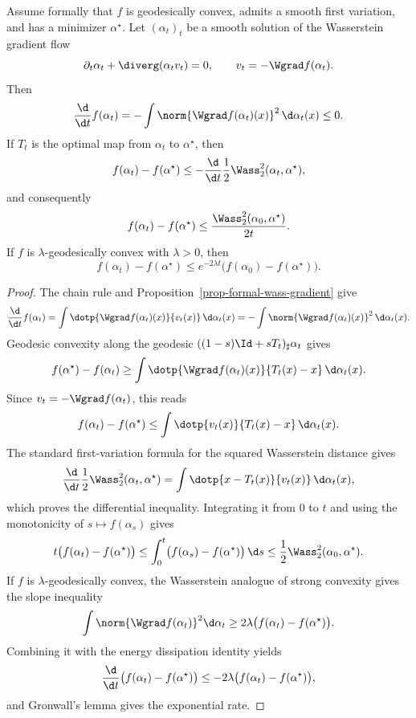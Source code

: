 \begin{prop}\label{prop-convex-wass-flow-rate}
	Assume formally that $f$ is geodesically convex, admits a smooth first variation, and has a minimizer $\alpha^\star$. Let $(\alpha_t)_t$ be a smooth solution of the Wasserstein gradient flow
	\[
		\partial_t\alpha_t+\diverg(\alpha_t v_t)=0,
		\qquad
		v_t=-\Wgrad f(\alpha_t).
	\]
	Then
	\[
		\frac{\d}{\d t} f(\alpha_t)
		=
		-\int \norm{\Wgrad f(\alpha_t)(x)}^2\,\d\alpha_t(x)
		\leq 0.
	\]
	If $T_t$ is the optimal map from $\alpha_t$ to $\alpha^\star$, then
	\[
		f(\alpha_t)-f(\alpha^\star)
		\leq
		-\frac{\d}{\d t}\frac12 \Wass_2^2(\alpha_t,\alpha^\star),
	\]
	and consequently
	\[
		f(\alpha_t)-f(\alpha^\star)
		\leq
		\frac{\Wass_2^2(\alpha_0,\alpha^\star)}{2t}.
	\]
	If $f$ is $\lambda$-geodesically convex with $\lambda>0$, then
	\[
		f(\alpha_t)-f(\alpha^\star)
		\leq
		e^{-2\lambda t}\bigl(f(\alpha_0)-f(\alpha^\star)\bigr).
	\]
\end{prop}

\begin{proof}
	The chain rule and Proposition~\ref{prop-formal-wass-gradient} give
	\[
		\frac{\d}{\d t}f(\alpha_t)
		=
		\int \dotp{\Wgrad f(\alpha_t)(x)}{v_t(x)}\,\d\alpha_t(x)
		=
		-\int \norm{\Wgrad f(\alpha_t)(x)}^2\,\d\alpha_t(x).
	\]
	Geodesic convexity along the geodesic
	$((1-s)\Id+sT_t)_\sharp\alpha_t$ gives
	\[
		f(\alpha^\star)-f(\alpha_t)
		\geq
		\int \dotp{\Wgrad f(\alpha_t)(x)}{T_t(x)-x}\,\d\alpha_t(x).
	\]
	Since $v_t=-\Wgrad f(\alpha_t)$, this reads
	\[
		f(\alpha_t)-f(\alpha^\star)
		\leq
		\int \dotp{v_t(x)}{T_t(x)-x}\,\d\alpha_t(x).
	\]
	The standard first-variation formula for the squared Wasserstein distance gives
	\[
		\frac{\d}{\d t}\frac12\Wass_2^2(\alpha_t,\alpha^\star)
		=
		\int \dotp{x-T_t(x)}{v_t(x)}\,\d\alpha_t(x),
	\]
	which proves the differential inequality. Integrating it from $0$ to $t$ and using the monotonicity of $s\mapsto f(\alpha_s)$ gives
	\[
		t\bigl(f(\alpha_t)-f(\alpha^\star)\bigr)
		\leq
		\int_0^t \bigl(f(\alpha_s)-f(\alpha^\star)\bigr)\,\d s
		\leq
		\frac12\Wass_2^2(\alpha_0,\alpha^\star).
	\]
	If $f$ is $\lambda$-geodesically convex, the Wasserstein analogue of strong convexity gives the slope inequality
	\[
		\int\norm{\Wgrad f(\alpha_t)}^2\d\alpha_t
		\geq
		2\lambda\bigl(f(\alpha_t)-f(\alpha^\star)\bigr).
	\]
	Combining it with the energy dissipation identity yields
	\[
		\frac{\d}{\d t}\bigl(f(\alpha_t)-f(\alpha^\star)\bigr)
		\leq
		-2\lambda\bigl(f(\alpha_t)-f(\alpha^\star)\bigr),
	\]
	and Gronwall's lemma gives the exponential rate.
\end{proof}

